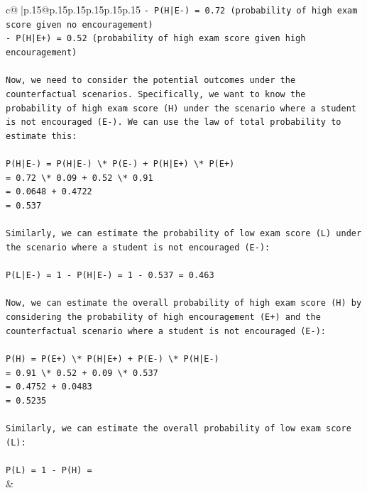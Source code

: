 \documentclass{article}
\begin{document}
{\begin{supertabular}{c@{$\;$}|p{.15\linewidth}@{}p{.15\linewidth}p{.15\linewidth}p{.15\linewidth}p{.15\linewidth}p{.15\linewidth}}
{{{\texttt{{-} P(H|E{-}) = 0.72 (probability of high exam score given no encouragement)} \\
\texttt{{-} P(H|E+) = 0.52 (probability of high exam score given high encouragement)} \\
\\ 
\texttt{Now, we need to consider the potential outcomes under the counterfactual scenarios. Specifically, we want to know the probability of high exam score (H) under the scenario where a student is not encouraged (E{-}). We can use the law of total probability to estimate this:} \\
\\ 
\texttt{P(H|E{-}) = P(H|E{-}) \textbackslash{}* P(E{-}) + P(H|E+) \textbackslash{}* P(E+)} \\
\texttt{= 0.72 \textbackslash{}* 0.09 + 0.52 \textbackslash{}* 0.91} \\
\texttt{= 0.0648 + 0.4722} \\
\texttt{= 0.537} \\
\\ 
\texttt{Similarly, we can estimate the probability of low exam score (L) under the scenario where a student is not encouraged (E{-}):} \\
\\ 
\texttt{P(L|E{-}) = 1 {-} P(H|E{-}) = 1 {-} 0.537 = 0.463} \\
\\ 
\texttt{Now, we can estimate the overall probability of high exam score (H) by considering the probability of high encouragement (E+) and the counterfactual scenario where a student is not encouraged (E{-}):} \\
\\ 
\texttt{P(H) = P(E+) \textbackslash{}* P(H|E+) + P(E{-}) \textbackslash{}* P(H|E{-})} \\
\texttt{= 0.91 \textbackslash{}* 0.52 + 0.09 \textbackslash{}* 0.537} \\
\texttt{= 0.4752 + 0.0483} \\
\texttt{= 0.5235} \\
\\ 
\texttt{Similarly, we can estimate the overall probability of low exam score (L):} \\
\\ 
\texttt{P(L) = 1 {-} P(H) =} \\
            }
        }
    }
    & \\ \\


\end{supertabular}}
\end{document}
